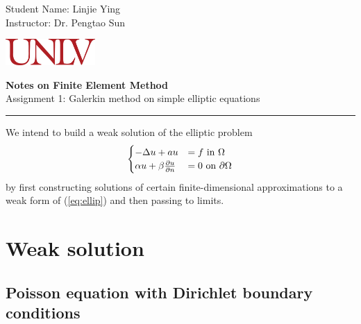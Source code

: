 \documentclass[11pt,letterpaper]{article}
\newtheorem{thm}{Theorem}
\begin{document}
\pagestyle{plain}

\begin{flushleft}
Student Name: Linjie Ying\\
 Instructor:  Dr. Pengtao Sun
\end{flushleft}

\begin{flushright}\vspace{-15mm}
\includegraphics[height=1cm]{png/UNLV.png}
\end{flushright}
 
\begin{center}\vspace{0cm}
\textbf{\large Notes on Finite Element Method}\\
Assignment 1: Galerkin method on simple elliptic equations
\end{center}

 
\rule{\linewidth}{0.1mm}





We intend to build a weak solution of the elliptic problem
\begin{equation}
  \label{eq:ellip}
  \begin{cases}
    -\Delta u+au&= f\textmd{ in }\Omega\\
    \alpha u+\beta \frac{\partial u}{\partial n}&=0\textmd{ on }\partial \Omega
  \end{cases}
\end{equation}
by first constructing solutions of certain finite-dimensional approximations to
a weak form of (\ref{eq:ellip})
and then passing to limits.



\section{Weak solution}
\label{sec:weak}

\subsection{ Poisson equation with Dirichlet boundary conditions}
\label{sec:dirichlet}
\end{document}
